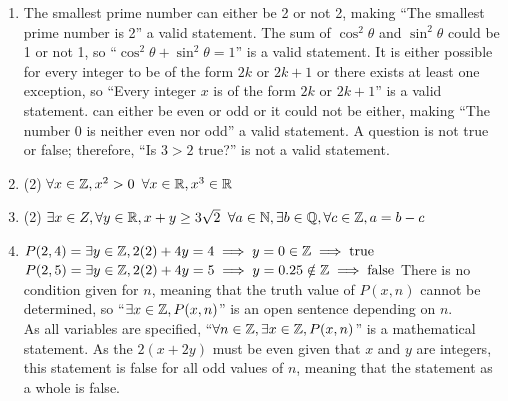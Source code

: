 \documentclass[../MATH135.tex]{subfiles}
\begin{document}
		\begin{enumerate}
			\item
				\begin{tasks}
					\task
						The smallest prime number can either be 2 or not 2, making \enquote{The smallest prime number is 2} a valid statement.
					\task
						The sum of \(\cos^2\theta\) and \(\sin^2\theta\) could be 1 or not 1, so \enquote{\(\cos^2\theta + \sin^2\theta = 1\)} is a valid statement.
					\task
						It is either possible for every integer to be of the form \(2k\) or \(2k + 1\) or there exists at least one exception, so \enquote{Every integer \(x\) is of the form \(2k\) or \(2k + 1\)} is a valid statement.
					 can either be even or odd or it could not be either, making \enquote{The number 0 is neither even nor odd} a valid statement.
					\task
						A question is not true or false; therefore, \enquote{Is \(3 > 2\) true?} is not a valid statement.
				\end{tasks}
			\item
				\begin{tasks}(2)
					\task
						\(\forall x \in \mathbb{Z}, x^2 > 0\)
					\task
						\(\forall x \in \mathbb{R}, x^3 \in \mathbb{R}\)				
				\end{tasks}
			\item
				\begin{tasks}(2)
					\task
						\(\exists x \in Z, \forall y \in \mathbb{R}, x + y \ge 3\sqrt{2}\)
					\task
						\(\forall a \in \mathbb{N}, \exists b \in \mathbb{Q}, \forall c \in \mathbb{Z}, a = b - c\)
				\end{tasks}
			\item
				\begin{tasks}
					\task	
						\(P(2, 4) = \exists y \in \mathbb{Z}, 2(2) + 4y = 4 \implies y = 0 \in \mathbb{Z} \implies \text{true}\) \\
						\(P(2, 5) = \exists y \in \mathbb{Z}, 2(2) + 4y = 5 \implies y = 0.25 \notin \mathbb{Z} \implies \text{false}\)
					\task
						There is no condition given for \(n\), meaning that the truth value of \(P(x, n)\) cannot be determined, so \enquote{\(\exists x \in \mathbb{Z}, P(x, n)\)} is an open sentence depending on \(n\). \\
					\task
						As all variables are specified, \enquote{\(\forall n \in \mathbb{Z}, \exists x \in \mathbb{Z}, P(x, n)\)} is a mathematical statement. As the \(2(x + 2y)\) must be even given that \(x\) and \(y\) are integers, this statement is false for all odd values of \(n\), meaning that the statement as a whole is false.
				\end{tasks}

\end{enumerate}
\end{document}
